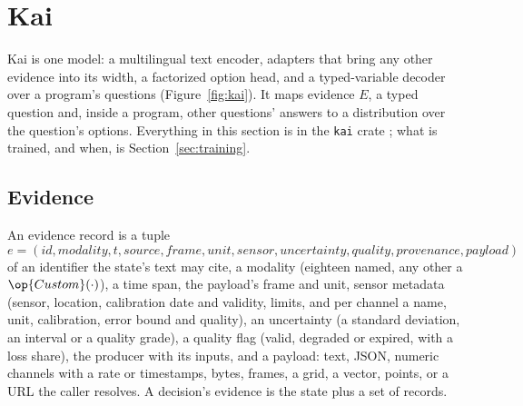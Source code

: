 \section{Kai}
\label{sec:model}

Kai is one model: a multilingual text encoder, adapters that bring any other
evidence into its width, a factorized option head, and a typed-variable decoder
over a program's questions (Figure~\ref{fig:kai}). It maps evidence $E$, a
typed question and, inside a program, other questions' answers to a
distribution over the question's options. Everything in this section is in the
\texttt{kai} crate \shipped; what is trained, and when, is
Section~\ref{sec:training}.



\subsection{Evidence}
\label{sec:evidence}

\begin{definition}[Evidence]
An evidence record is a tuple
\[
  e = (\mathit{id}, \mathit{modality}, t, \mathit{source}, \mathit{frame},
  \mathit{unit}, \mathit{sensor}, \mathit{uncertainty}, \mathit{quality},
  \mathit{provenance}, \mathit{payload})
\]
of an identifier the state's text may cite, a modality (eighteen named, any
other a $\op{Custom}(\cdot)$), a time span, the payload's frame and unit, sensor
metadata (sensor, location, calibration date and validity, limits, and per
channel a name, unit, calibration, error bound and quality), an uncertainty (a
standard deviation, an interval or a quality grade), a quality flag (valid,
degraded or expired, with a loss share), the producer with its inputs, and a
payload: text, JSON, numeric channels with a rate or timestamps, bytes, frames,
a grid, a vector, points, or a URL the caller resolves. A decision's evidence is
the state plus a set of records.
\end{definition}

